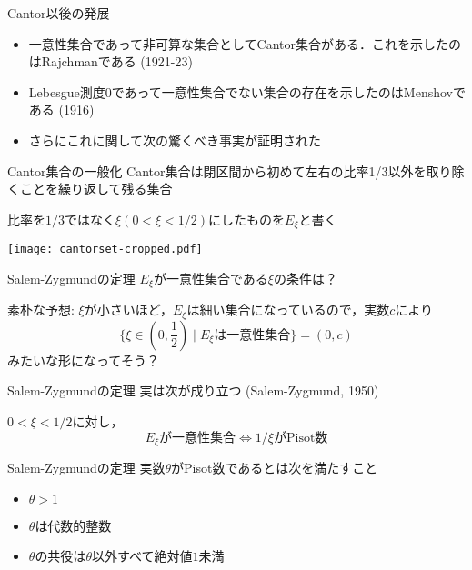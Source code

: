 \documentclass[dvipdfmx,17pt]{beamer}
\theoremstyle{plain}
\begin{document}
\begin{frame}{Cantor以後の発展}
\begin{itemize}
\item 一意性集合であって非可算な集合としてCantor集合がある．これを示したのはRajchmanである (1921-23)

\item Lebesgue測度$0$であって一意性集合でない集合の存在を示したのはMenshovである (1916)

\item さらにこれに関して次の驚くべき事実が証明された
\end{itemize}
\end{frame}

\begin{frame}{Cantor集合の一般化}
Cantor集合は閉区間から初めて左右の比率1/3以外を取り除くことを繰り返して残る集合

比率を$1/3$ではなく$\xi (0 < \xi < 1/2)$にしたものを$E_\xi$と書く


\begin{center}
\texttt{[image: cantorset-cropped.pdf]}
\end{center}
\end{frame}




\begin{frame}{Salem-Zygmundの定理}
$E_{\xi}$が一意性集合である$\xi$の条件は？

\vspace{0.5cm}
素朴な予想:
$\xi$が小さいほど，$E_{\xi}$は細い集合になっているので，実数$c$により
\[\{\xi \in (0, \frac{1}{2}) \mid E_\xi \text{は一意性集合} \} = (0, c)\]
みたいな形になってそう？
\end{frame}

\begin{frame}{Salem-Zygmundの定理}
実は次が成り立つ (Salem-Zygmund, 1950)
\vspace{0.5cm}

$0 < \xi < 1/2$に対し，
\[E_{\xi}\text{が一意性集合} \iff 1/\xi\text{がPisot数}\]
\end{frame}

\begin{frame}{Salem-Zygmundの定理}
実数$\theta$がPisot数であるとは次を満たすこと
\begin{itemize}
\item $\theta > 1$
\item $\theta$は代数的整数
\item $\theta$の共役は$\theta$以外すべて絶対値$1$未満
\end{itemize}
\end{frame}
\end{document}
